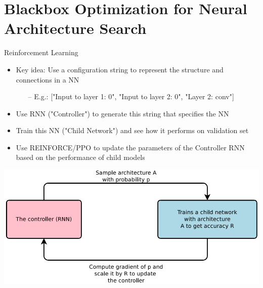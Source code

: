 \section{Blackbox Optimization for Neural Architecture Search}
\begin{frame}[c]{Reinforcement Learning }
\centering
\begin{itemize}
	\item Key idea: Use a configuration string to represent the structure and connections in a NN
	\begin{itemize}
		\item[--] E.g.: ["Input to layer 1: 0", "Input to layer 2: 0", "Layer 2: conv"]
	\end{itemize}
	\item Use RNN ("\alert{Controller}") to generate this string that specifies the NN
	\item Train this NN ("\alert{Child Network}") and see how it performs on validation set
	\item Use \alert{REINFORCE/PPO} to update the parameters of the Controller RNN based on the performance of
	child models
\end{itemize}

{\centering
	\includegraphics[width=.6\textwidth]{images_lec7/s27}
}
\end{frame}
